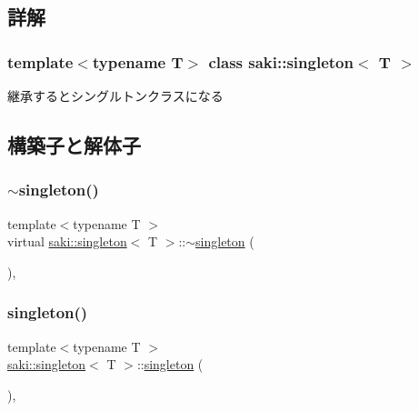 \subsection{詳解}
\subsubsection*{template$<$typename T$>$\newline
class saki\+::singleton$<$ T $>$}

継承するとシングルトンクラスになる 

\subsection{構築子と解体子}
\mbox{\label{classsaki_1_1singleton_a7e18a317dec7a4658f6d3376f2dd3ebd}} 
\subsubsection{\texorpdfstring{$\sim$singleton()}{~singleton()}}
{\footnotesize\ttfamily template$<$typename T $>$ \\
virtual \mbox{\hyperlink{classsaki_1_1singleton}{saki\+::singleton}}$<$ T $>$\+::$\sim$\mbox{\hyperlink{classsaki_1_1singleton}{singleton}} (\begin{DoxyParamCaption}{ }\end{DoxyParamCaption})\hspace{0.3cm}{\ttfamily [inline]}, {\ttfamily [virtual]}}

\mbox{\label{classsaki_1_1singleton_a511f5d5e51fdac173fa0dbea858f5ee0}} 
\subsubsection{\texorpdfstring{singleton()}{singleton()}}
{\footnotesize\ttfamily template$<$typename T $>$ \\
\mbox{\hyperlink{classsaki_1_1singleton}{saki\+::singleton}}$<$ T $>$\+::\mbox{\hyperlink{classsaki_1_1singleton}{singleton}} (\begin{DoxyParamCaption}{ }\end{DoxyParamCaption})\hspace{0.3cm}{\ttfamily [inline]}, {\ttfamily [protected]}}



